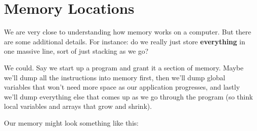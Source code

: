 \documentclass[12pt]{article}
\begin{document}
\begin{center}
\vspace{1em}
\vspace{1em}
\end{center}

\section*{Memory Locations}

We are very close to understanding how memory works on a computer. But there are some additional details. For instance: do we really just store \textbf{everything} in one massive line, sort of just stacking as we go?

We could. Say we start up a program and grant it a section of memory. Maybe we'll dump all the instructions into memory first, then we'll dump global variables that won't need more space as our application progresses, and lastly we'll dump everything else that comes up as we go through the program (so think local variables and arrays that grow and shrink).

Our memory might look something like this:
\end{document}

